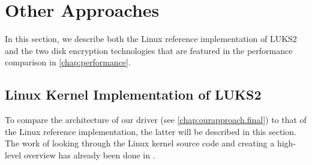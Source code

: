 \section{Other Approaches}
\label{chap:otherapproaches}
In this section, we describe both the Linux reference implementation of LUKS2 and the two disk encryption technologies that are featured in the performance comparison in \autoref{chap:performance}.

\subsection{Linux Kernel Implementation of LUKS2}
\label{chap:otherapproaches.linux}
To compare the architecture of our driver (see \autoref{chap:ourapproach.final}) to that of the Linux reference implementation, the latter will be described in this section. \\ The work of looking through the Linux kernel source code and creating a high-level overview has already been done in \cite{Korchagin2020}.

